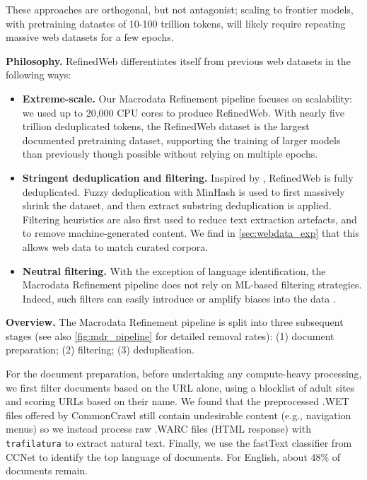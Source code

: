 \documentclass{article}
\begin{document}
These approaches are orthogonal, but not antagonist; scaling to frontier models, with pretraining datastes of 10-100 trillion tokens, will likely require repeating massive web datasets for a few epochs. 

\textbf{Philosophy.} RefinedWeb differentiates itself from previous web datasets in the following ways:

\begin{itemize}
    \item \textbf{Extreme-scale.} Our Macrodata Refinement pipeline focuses on scalability: we used up to 20,000 CPU cores to produce RefinedWeb. With nearly five trillion deduplicated tokens, the RefinedWeb dataset is the largest documented pretraining dataset, supporting the training of larger models than previously though possible without relying on multiple epochs.
    \item \textbf{Stringent deduplication and filtering.} Inspired by \citet{lee2022deduplicating}, RefinedWeb is fully deduplicated. Fuzzy deduplication with MinHash is used to first massively shrink the dataset, and then extract substring deduplication is applied. Filtering heuristics are also first used to reduce text extraction artefacts, and to remove machine-generated content. We find in \cref{sec:webdata_exp} that this allows web data to match curated corpora.
    \item \textbf{Neutral filtering.} With the exception of language identification, the Macrodata Refinement pipeline does not rely on ML-based filtering strategies. Indeed, such filters can easily introduce or amplify biases into the data \cite{dodge2021documenting, welbl2021challenges}.
\end{itemize}

\textbf{Overview.} The Macrodata Refinement pipeline is split into three subsequent stages (see also \cref{fig:mdr_pipeline} for detailed removal rates): (1) document preparation; (2) filtering; (3) deduplication. 

For the document preparation, before undertaking any compute-heavy processing, we first filter documents based on the URL alone, using a blocklist of adult sites and scoring URLs based on their name. We found that the preprocessed .WET files offered by CommonCrawl still contain undesirable content (e.g., navigation menus) so we instead process raw .WARC files (HTML response) with \texttt{trafilatura} to extract natural text.  Finally, we use the fastText classifier from CCNet \citep{wenzek2020ccnet} to identify the top language of documents. For English, about 48\% of documents remain.
\end{document}

